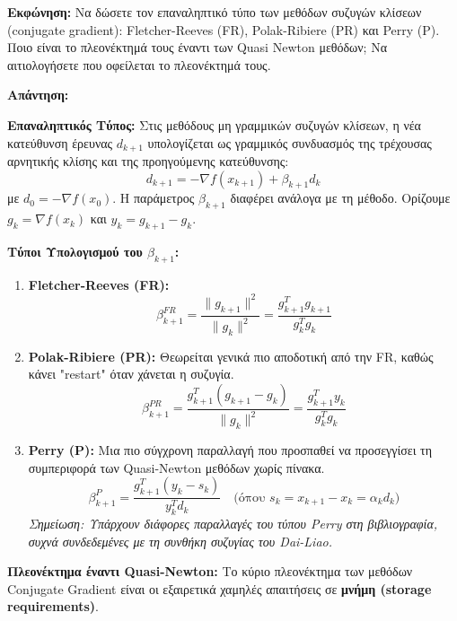 \documentclass[a4paper,12pt]{article}
\begin{document}
\textbf{Εκφώνηση:}
Να δώσετε τον επαναληπτικό τύπο των μεθόδων συζυγών κλίσεων (conjugate gradient): Fletcher-Reeves (FR), Polak-Ribiere (PR) και Perry (P). Ποιο είναι το πλεονέκτημά τους έναντι των Quasi Newton μεθόδων; Να αιτιολογήσετε που οφείλεται το πλεονέκτημά τους.

\textbf{Απάντηση:}

\textbf{Επαναληπτικός Τύπος:}
Στις μεθόδους μη γραμμικών συζυγών κλίσεων, η νέα κατεύθυνση έρευνας $d_{k+1}$ υπολογίζεται ως γραμμικός συνδυασμός της τρέχουσας αρνητικής κλίσης και της προηγούμενης κατεύθυνσης:
\begin{equation}
    d_{k+1} = -\nabla f(x_{k+1}) + \beta_{k+1} d_k
\end{equation}
με $d_0 = -\nabla f(x_0)$.
Η παράμετρος $\beta_{k+1}$ διαφέρει ανάλογα με τη μέθοδο. Ορίζουμε $g_k = \nabla f(x_k)$ και $y_k = g_{k+1} - g_k$.

\textbf{Τύποι Υπολογισμού του $\beta_{k+1}$:}
\begin{enumerate}
    \item \textbf{Fletcher-Reeves (FR):}
    \begin{equation}
        \beta_{k+1}^{FR} = \frac{\|g_{k+1}\|^2}{\|g_k\|^2} = \frac{g_{k+1}^T g_{k+1}}{g_k^T g_k}
    \end{equation}
    
    \item \textbf{Polak-Ribiere (PR):}
    Θεωρείται γενικά πιο αποδοτική από την FR, καθώς κάνει "restart" όταν χάνεται η συζυγία.
    \begin{equation}
        \beta_{k+1}^{PR} = \frac{g_{k+1}^T (g_{k+1} - g_k)}{\|g_k\|^2} = \frac{g_{k+1}^T y_k}{g_k^T g_k}
    \end{equation}
    
    \item \textbf{Perry (P):}
    Μια πιο σύγχρονη παραλλαγή που προσπαθεί να προσεγγίσει τη συμπεριφορά των Quasi-Newton μεθόδων χωρίς πίνακα.
    \begin{equation}
        \beta_{k+1}^{P} = \frac{g_{k+1}^T (y_k - s_k)}{y_k^T d_k} \quad \text{(όπου } s_k = x_{k+1} - x_k = \alpha_k d_k \text{)}
    \end{equation}
    \textit{Σημείωση: Υπάρχουν διάφορες παραλλαγές του τύπου Perry στη βιβλιογραφία, συχνά συνδεδεμένες με τη συνθήκη συζυγίας του Dai-Liao.}
\end{enumerate}

\textbf{Πλεονέκτημα έναντι Quasi-Newton:}
Το κύριο πλεονέκτημα των μεθόδων Conjugate Gradient είναι οι εξαιρετικά χαμηλές απαιτήσεις σε \textbf{μνήμη (storage requirements)}.
\end{document}
